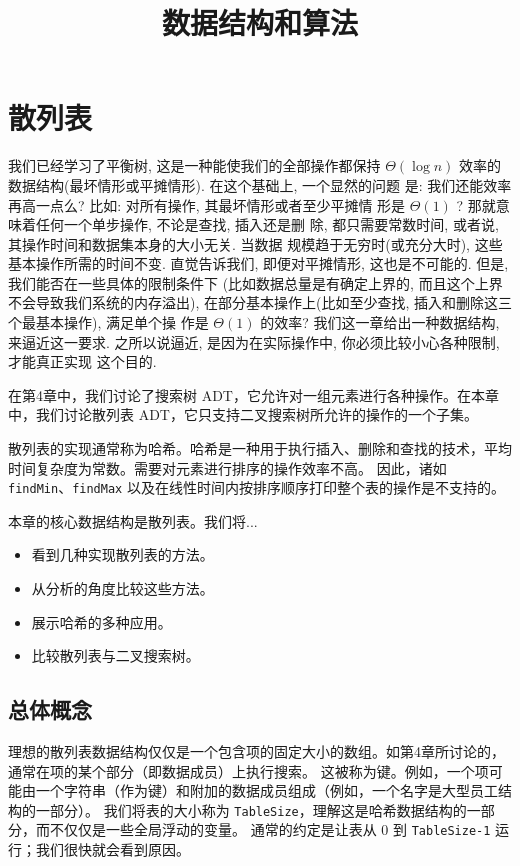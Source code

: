 \documentclass[a4paper]{ctexart}
\title{数据结构和算法}
\author{}
\date{}
\theoremstyle{definition}
\theoremstyle{definition}
\begin{document}
\maketitle
\pagestyle{empty}

\setcounter{section}{4}
\section{散列表}

我们已经学习了平衡树, 这是一种能使我们的全部操作都保持 $\Theta(\log
n)$ 效率的数据结构(最坏情形或平摊情形). 在这个基础上, 一个显然的问题
是: 我们还能效率再高一点么? 比如: 对所有操作, 其最坏情形或者至少平摊情
形是 $\Theta(1)$ ? 那就意味着任何一个单步操作, 不论是查找, 插入还是删
除, 都只需要常数时间, 或者说, 其操作时间和数据集本身的大小无关. 当数据
规模趋于无穷时(或充分大时), 这些基本操作所需的时间不变. 直觉告诉我们,
即便对平摊情形, 这也是不可能的. 但是, 我们能否在一些具体的限制条件下
(比如数据总量是有确定上界的, 而且这个上界不会导致我们系统的内存溢出),
在部分基本操作上(比如至少查找, 插入和删除这三个最基本操作), 满足单个操
作是 $\Theta(1)$ 的效率? 我们这一章给出一种数据结构, 来逼近这一要求.
之所以说逼近, 是因为在实际操作中, 你必须比较小心各种限制, 才能真正实现
这个目的.

在第4章中，我们讨论了搜索树 ADT，它允许对一组元素进行各种操作。在本章中，我们讨论散列表 ADT，它只支持二叉搜索树所允许的操作的一个子集。

散列表的实现通常称为哈希。哈希是一种用于执行插入、删除和查找的技术，平均时间复杂度为常数。需要对元素进行排序的操作效率不高。
因此，诸如 \verb|findMin|、\verb|findMax| 以及在线性时间内按排序顺序打印整个表的操作是不支持的。

本章的核心数据结构是散列表。我们将...

\begin{itemize}
    \item 看到几种实现散列表的方法。
    \item 从分析的角度比较这些方法。
    \item 展示哈希的多种应用。
    \item 比较散列表与二叉搜索树。
\end{itemize}

\subsection{总体概念}

理想的散列表数据结构仅仅是一个包含项的固定大小的数组。如第4章所讨论的，通常在项的某个部分（即数据成员）上执行搜索。
这被称为键。例如，一个项可能由一个字符串（作为键）和附加的数据成员组成（例如，一个名字是大型员工结构的一部分）。
我们将表的大小称为 \texttt{TableSize}，理解这是哈希数据结构的一部分，而不仅仅是一些全局浮动的变量。
通常的约定是让表从 0 到 \texttt{TableSize-1} 运行；我们很快就会看到原因。
\end{document}

